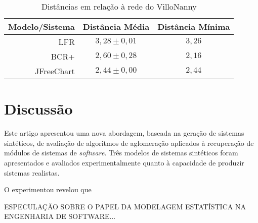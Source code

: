 \documentclass{acm_proc_article-sp}
\begin{document}
\begin{table}
\caption{Distâncias em relação à rede do VilloNanny}
\begin{center}
\begin{tabular}{r | c c}
\hline
\hline
Modelo/Sistema & Distância Média              & Distância Mínima \\
\hline
LFR        & $3,28 \pm 0,01$ & $3,26$ \\
BCR+        & $2,60 \pm 0,28$ & $2,16$ \\
JFreeChart & $2,44 \pm 0,00$ & $2,44$ \\
\hline
\end{tabular}
\end{center}
\end{table}


\section{Discussão} \label{sec:discussao} %

Este artigo apresentou uma nova abordagem, baseada na geração de sistemas sintéticos, de avaliação de algoritmos de aglomeração aplicados à recuperação de módulos de sistemas de \emph{software}. Três modelos de sistemas sintéticos foram apresentados e avaliados experimentalmente quanto à capacidade de produzir sistemas realistas.

O experimentou revelou que 


ESPECULAÇÃO SOBRE O PAPEL DA MODELAGEM ESTATÍSTICA NA ENGENHARIA DE SOFTWARE...

\end{document}
